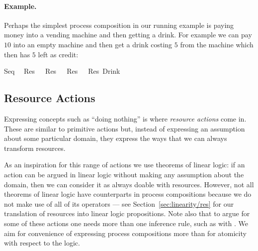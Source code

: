 \documentclass[class=smolathesis,crop=false]{standalone}
\begin{document}
\paragraph*{Example.}
Perhaps the simplest process composition in our running example is paying money into a vending machine and then getting a drink.
For example we can pay $10$ into an empty machine and then get a drink costing $5$ from the machine which then has $5$ left as credit:
\begin{isabelle}
\centering
  Seq\ \ \isanewline
  Res\ \ \isasymodot\ Res\ \ \isasymrightarrow\ Res\ \ \isasymodot\ Res\ Drink
\end{isabelle}

\subsection{Resource Actions}
\label{sec:proc/type/res}

Expressing concepts such as ``doing nothing'' is where \emph{resource actions} come in.
These are similar to primitive actions but, instead of expressing an assumption about some particular domain, they express the ways that we can always transform resources.

As an inspiration for this range of actions we use theorems of linear logic: if an action can be argued in linear logic without making any assumption about the domain, then we can consider it as always doable with resources.
However, not all theorems of linear logic have counterparts in process compositions because we do not make use of all of its operators --- see Section~\ref{sec:linearity/res} for our translation of resources into linear logic propositions.
Note also that to argue for some of these actions one needs more than one inference rule, such as with .
We aim for convenience of expressing process compositions more than for atomicity with respect to the logic.
\end{document}
